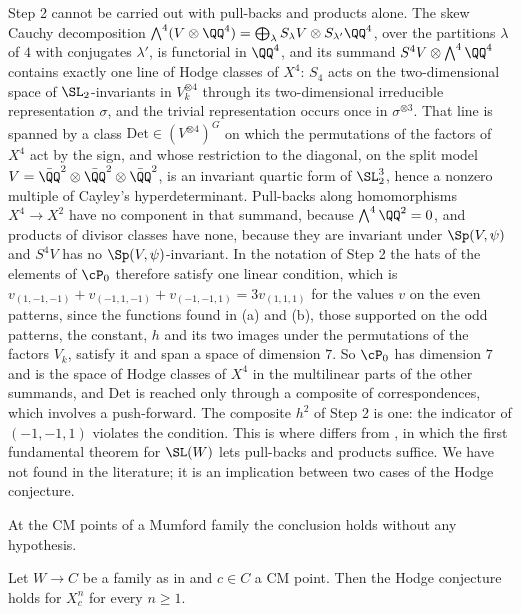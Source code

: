 \begin{remark}\label{rem:mumforddet}
Step 2 cannot be carried out with pull-backs and products alone. The skew
Cauchy decomposition $\bigwedge^{4}(V\otimes\QQ^{4})=\bigoplus_{\lambda}
S_{\lambda}V\otimes S_{\lambda'}\QQ^{4}$, over the partitions $\lambda$ of $4$
with conjugates $\lambda'$, is functorial in $\QQ^{4}$, and its summand
$S^{4}V\otimes\bigwedge^{4}\QQ^{4}$ contains exactly one line of Hodge classes
of $X^{4}$: $S_{4}$ acts on the two-dimensional space of $\SL_{2}$-invariants
in $V_{k}^{\otimes4}$ through its two-dimensional irreducible representation
$\sigma$, and the trivial representation occurs once in $\sigma^{\otimes3}$.
That line is spanned by a class $\mathrm{Det}\in(V^{\otimes4})^{G}$ on which
the permutations of the factors of $X^{4}$ act by the sign, and whose
restriction to the diagonal, on the split model
$V=\bar{\QQ}^{2}\otimes\bar{\QQ}^{2}\otimes\bar{\QQ}^{2}$, is an invariant
quartic form of $\SL_{2}^{3}$, hence a nonzero multiple of Cayley's
hyperdeterminant. Pull-backs along homomorphisms
$X^{4}\to X^{2}$ have no component in that summand, because
$\bigwedge^{4}\QQ^{2}=0$, and products of divisor classes have none, because
they are invariant under $\Sp(V,\psi)$ and $S^{4}V$ has no
$\Sp(V,\psi)$-invariant. In the notation of Step 2 the hats of the elements
of $\cP_{0}$ therefore satisfy one linear condition, which is
$v_{(1,-1,-1)}+v_{(-1,1,-1)}+v_{(-1,-1,1)}=3v_{(1,1,1)}$ for the values $v$ on
the even patterns, since the functions found in (a) and (b), those supported
on the odd patterns, the constant, $h$ and its two images under the
permutations of the factors $V_{k}$, satisfy it and
span a space of dimension $7$. So $\cP_{0}$ has dimension $7$ and is the space
of Hodge classes of $X^{4}$ in the multilinear parts of the other summands,
and $\mathrm{Det}$ is reached only through a composite of correspondences,
which involves a push-forward. The composite $h^{2}$ of Step 2 is one: the
indicator of $(-1,-1,1)$ violates the condition. This is where
 differs from , in which the first
fundamental theorem for $\SL(W)$ lets pull-backs and products suffice. We have
not found  in the literature; it is an implication
between two cases of the Hodge conjecture.
\end{remark}

At the CM points of a Mumford family the conclusion holds without any
hypothesis.

\begin{proposition}\label{prop:mumfordcmpowers}
Let $W\to C$ be a family as in  and $c\in C$ a CM
point. Then the Hodge conjecture holds for $X_{c}^{n}$ for every $n\ge1$.
\end{proposition}

